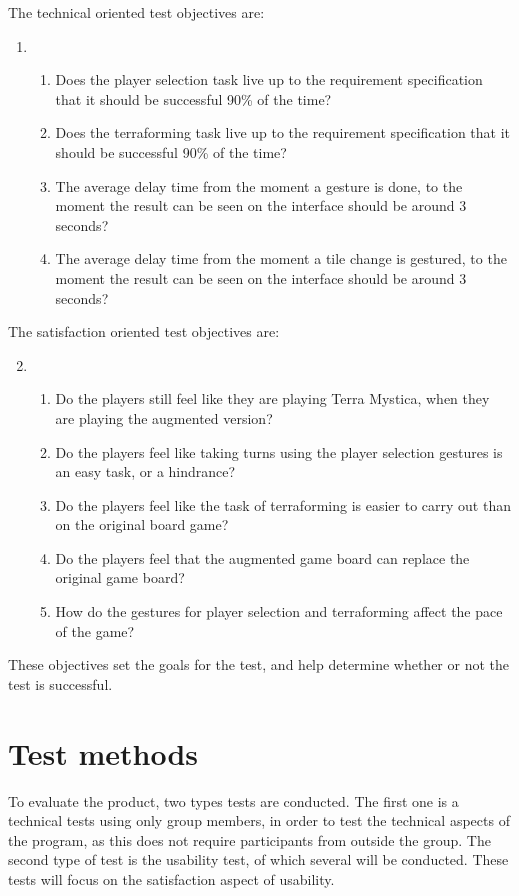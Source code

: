 The technical oriented test objectives are:
\begin{enumerate}
\setcounter{enumi}{0}
\item \begin{enumerate}
\item Does the player selection task live up to the requirement specification that it should be successful 90\% of the time? \label{req:1A}
\item Does the terraforming task live up to the requirement specification that it should be successful 90\% of the time? \label{req:1B}
\item The average delay time from the moment a gesture is done, to the moment the result can be seen on the interface should be around 3 seconds? \label{req:1C}
\item The average delay time from the moment a tile change is gestured, to the moment the result can be seen on the interface should be around 3 seconds? \label{req:1D}
\end{enumerate}
\end{enumerate}
The satisfaction oriented test objectives are:
\begin{enumerate}
\setcounter{enumi}{1}
\item \begin{enumerate}
\item Do the players still feel like they are playing Terra Mystica, when they are playing the augmented version? \label{req:2A}
\item Do the players feel like taking turns using the player selection gestures is an easy task, or a hindrance? \label{req:2B}
\item Do the players feel like the task of terraforming is easier to carry out than on the original board game? \label{req:2C}
\item Do the players feel that the augmented game board can replace the original game board? \label{req:2D}
\item How do the gestures for player selection and terraforming affect the pace of the game? \label{req:2E}
\end{enumerate}
\end{enumerate}

These objectives set the goals for the test, and help determine whether or not the test is successful. 

\section{Test methods}
To evaluate the product, two types tests are conducted. The first one is a technical tests using only group members, in order to test the technical aspects of the program, as this does not require participants from outside the group. The second type of test is the usability test, of which several will be conducted. These tests will focus on the satisfaction aspect of usability.

